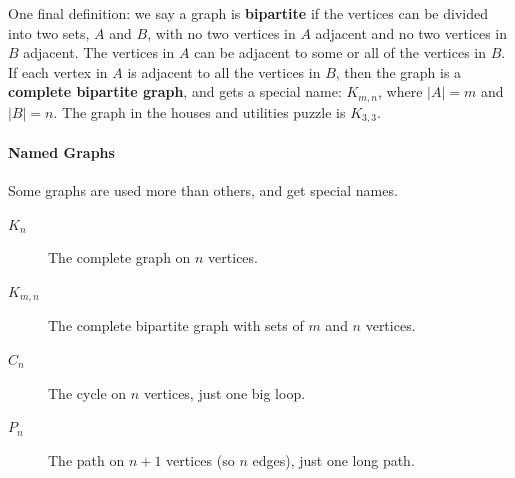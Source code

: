 \documentclass[10pt,]{book}
\newcommand{\terminology}[1]{\textbf{#1}}
\theoremstyle{plain}
\theoremstyle{definition}
\theoremstyle{definition}
\theoremstyle{definition}
\numberwithin{equation}{chapter}
\begin{document}
\hypertarget{p-99}{}%
One final definition: we say a graph is \terminology{bipartite} if the vertices can be divided into two sets, \(A\) and \(B\), with no two vertices in \(A\) adjacent and no two vertices in \(B\) adjacent. The vertices in \(A\) can be adjacent to some or all of the vertices in \(B\). If each vertex in \(A\) is adjacent to all the vertices in \(B\), then the graph is a \terminology{complete bipartite graph}, and gets a special name: \(K_{m,n}\), where \(|A| = m\) and \(|B| = n\). The graph in the houses and utilities puzzle is \(K_{3,3}\).%
\typeout{************************************************}
\typeout{************************************************}
\paragraph[{Named Graphs}]{Named Graphs}\hypertarget{paragraphs-2}{}
\hypertarget{p-100}{}%
Some graphs are used more than others, and get special names. \leavevmode%
\begin{description}
\item[{\(K_n\)}]\hypertarget{li-5}{}\hypertarget{p-101}{}%
The complete graph on \(n\) vertices.\label{notation-2}
%
\item[{\(K_{m,n}\)}]\hypertarget{li-6}{}\hypertarget{p-102}{}%
The complete bipartite graph with sets of \(m\) and \(n\) vertices. \label{notation-3}
%
\item[{\(C_n\)}]\hypertarget{li-7}{}\hypertarget{p-103}{}%
The cycle on \(n\) vertices, just one big loop. \label{notation-4}
%
\item[{\(P_n\)}]\hypertarget{li-8}{}\hypertarget{p-104}{}%
The path on \(n+1\) vertices (so \(n\) edges), just one long path. \label{notation-5}
%
\end{description}
%
\end{document}
